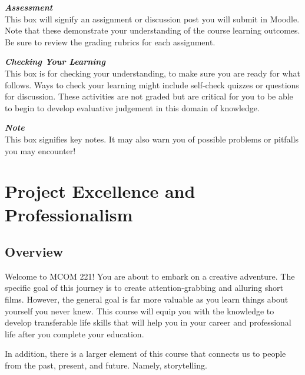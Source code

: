 \documentclass[
]{book}
\begin{document}
\begin{assessment}
\textbf{\emph{Assessment}}\\
This box will signify an assignment or discussion post you will submit in Moodle. Note that these demonstrate your understanding of the course learning outcomes. Be sure to review the grading rubrics for each assignment.
\end{assessment}

\begin{progress}
\textbf{\emph{Checking Your Learning}}\\
This box is for checking your understanding, to make sure you are ready for what follows. Ways to check your learning might include self-check quizzes or questions for discussion. These activities are not graded but are critical for you to be able to begin to develop evaluative judgement in this domain of knowledge.
\end{progress}

\begin{caution}
\textbf{\emph{Note}}\\
This box signifies key notes. It may also warn you of possible problems or pitfalls you may encounter!
\end{caution}

\hypertarget{project-excellence-and-professionalism}{%
\chapter{Project Excellence and Professionalism}\label{project-excellence-and-professionalism}}

\hypertarget{overview}{%
\section*{Overview}\label{overview}}

Welcome to MCOM 221! You are about to embark on a creative adventure. The specific goal of this journey is to create attention-grabbing and alluring short films. However, the general goal is far more valuable as you learn things about yourself you never knew. This course will equip you with the knowledge to develop transferable life skills that will help you in your career and professional life after you complete your education.

In addition, there is a larger element of this course that connects us to people from the past, present, and future. Namely, storytelling.
\end{document}
